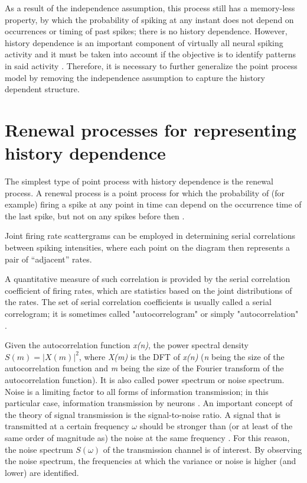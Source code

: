 \documentclass{kththesis}
\begin{document}
As a result of the independence assumption, this process still has a memory-less property, by which the probability of spiking at any instant does not depend on occurrences or timing of past spikes; there is no history dependence. 
However, history dependence is an important component of virtually all neural spiking activity and it must be taken into account if the objective is to identify patterns in said activity \parencite{Perkel}. 
Therefore, it is necessary to further generalize the point process model by removing the independence assumption to capture the history dependent structure.

\section{Renewal processes for representing history dependence}

The simplest type of point process with history dependence is the renewal process. 
A renewal process is a point process for which the probability of (for example) firing a spike at any point in time can depend on the occurrence time of the last spike, but not on any spikes before then  \parencite{Perkel}. 

Joint firing rate scattergrams can be employed in determining serial correlations between spiking intensities, where each point on the diagram then represents a pair of “adjacent” rates. 

A quantitative measure of such correlation is provided by the serial correlation coefficient of firing rates, which are statistics based on the joint distributions of the rates. 
The set of serial correlation coefficients is usually called a serial correlogram; it is sometimes called "autocorrelogram" or simply "autocorrelation"  \parencite{Perkel}. 

Given the autocorrelation function \textit{x(n)}, the power spectral density \begin{math}S(m) = |X(m)|^2\end{math}, where \textit{X(m)} is the DFT of \textit{x(n)} (\textit{n} being the size of the autocorrelation function and \textit{m} being the size of the Fourier transform of the autocorrelation function). 
It is also called power spectrum or noise spectrum. 
Noise is a limiting factor to all forms of information transmission; in this particular case, information transmission by neurons \parencite{Gerstner}. 
An important concept of the theory of signal transmission is the signal-to-noise ratio. 
A signal that is transmitted at a certain frequency \begin{math}\omega\end{math} should be stronger than (or at least of the same order of magnitude as) the noise at the same frequency \parencite{Gerstner}. 
For this reason, the noise spectrum \begin{math}S(\omega)\end{math} of the transmission channel is of interest. 
By observing the noise spectrum, the frequencies at which the variance or noise is higher (and lower) are identified.
\end{document}
